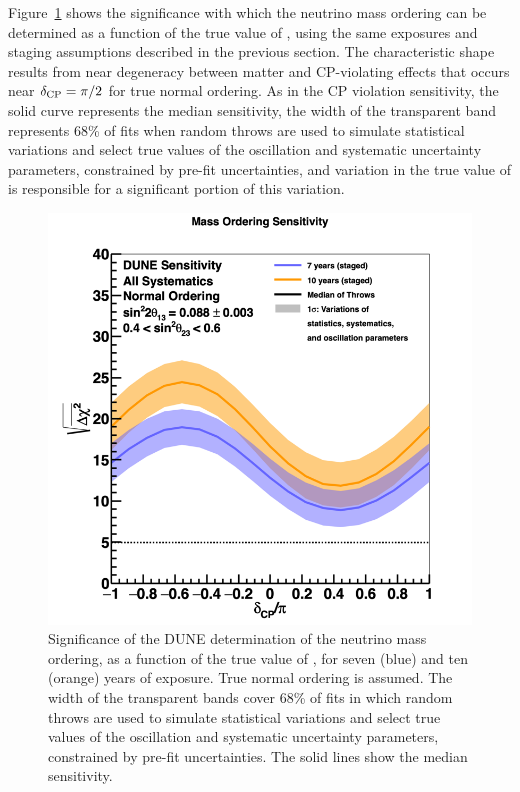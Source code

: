 Figure~\ref{fig:mh_nominal} shows the significance with which the neutrino mass ordering can be determined as a function of the true value of \deltacp, using the same exposures and staging assumptions described in the previous section. The characteristic shape results from near degeneracy between matter and CP-violating effects that occurs near $\delta_{\rm CP}=\pi/2$ for true normal ordering.
As in the CP violation sensitivity, the solid curve represents the median sensitivity, the width of the transparent band represents 68\% of fits when random throws are used to simulate statistical variations and select true values of the oscillation and systematic uncertainty parameters, constrained by pre-fit uncertainties, and variation in the true value of  is responsible for a significant portion of this variation.

\begin{figure}[h!]
    \centering
		\includegraphics[width=0.95\linewidth]{graphics/mh_two_exps_throws_nh_2019_v4.png}
	\caption[Significance of the DUNE neutrino mass ordering determination, as a function of \deltacp]{Significance of the DUNE determination of the neutrino mass ordering, as a function of the true value of \deltacp, for seven (blue) and ten (orange) years of exposure. True normal ordering is assumed. The width of the transparent bands cover 68\% of fits in which random throws are used to simulate statistical variations and select true values of the oscillation and systematic uncertainty parameters, constrained by pre-fit uncertainties. The solid lines show the median sensitivity. }
    \label{fig:mh_nominal}
\end{figure}

